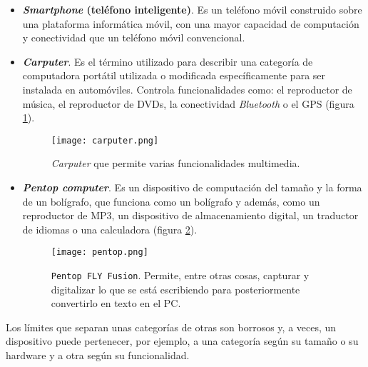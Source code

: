 \begin{itemize}
\item \textbf{\emph{Smartphone} (teléfono inteligente)}. Es un teléfono móvil 
construido sobre una plataforma informática móvil, con una mayor capacidad de 
computación y conectividad que un teléfono móvil convencional.
\item \textbf{\emph{Carputer}}. Es el término utilizado para describir una 
categoría de computadora portátil utilizada o modificada específicamente para 
ser instalada en automóviles. Controla funcionalidades como: el reproductor
de música, el reproductor de DVDs, la conectividad \emph{Bluetooth} o
el \acs{GPS} (figura \ref{fig:carputer}).

  \begin{figure}[H]
    \begin{center}
      \texttt{[image: carputer.png]}
      \caption{\emph{Carputer} que permite varias funcionalidades multimedia.}
      \label{fig:carputer}
    \end{center}
  \end{figure}

\item \textbf{\emph{Pentop computer}}. Es un dispositivo de computación del
tamaño y la forma de un bolígrafo, que funciona como un bolígrafo y además,
como un reproductor de \acs{MP3}, un dispositivo de almacenamiento digital, un 
traductor de idiomas o una calculadora (figura \ref{fig:pentop}).

  \begin{figure}[H]
    \begin{center}
      \texttt{[image: pentop.png]}
      \caption{\texttt{Pentop FLY Fusion}. Permite, entre otras cosas, 
      capturar y digitalizar lo que se está escribiendo para posteriormente
      convertirlo en texto en el PC.}
      \label{fig:pentop}
    \end{center}
  \end{figure}

\end{itemize}
Los límites que separan unas categorías de otras son borrosos y, a veces, un
dispositivo puede pertenecer, por ejemplo, a una categoría según su tamaño o
su hardware y a otra según su funcionalidad.

